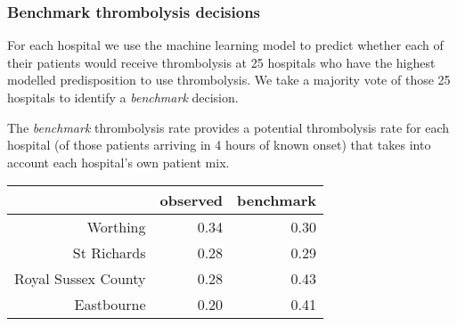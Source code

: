 \begin{frame}
\frametitle{Benchmark thrombolysis decisions}

For each hospital we use the machine learning model to predict whether each of their patients would receive thrombolysis at 25 hospitals who have the highest modelled predisposition to use thrombolysis. We take a majority vote of those 25 hospitals to identify a \emph{benchmark} decision.\\

\vspace{3mm}

The \emph{benchmark} thrombolysis rate provides a potential thrombolysis rate for each hospital (of those patients arriving in 4 hours of known onset) that takes into account each hospital's own patient mix.

\vspace{3mm}


\begin{table}[]
\begin{tabular}{rrr}
                            & observed & benchmark \\
\hline
Worthing                    & 0.34   & 0.30      \\
St Richards                 & 0.28   & 0.29     \\
Royal Sussex County         & 0.28   & 0.43     \\
Eastbourne                  & 0.20   & 0.41
\end{tabular}
\end{table}

\end{frame}
